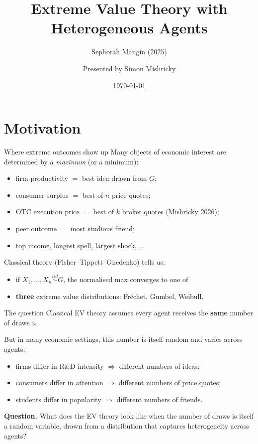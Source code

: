 \documentclass[aspectratio=169,xcolor=dvipsnames]{beamer}
\title{Extreme Value Theory with Heterogeneous Agents}
\subtitle{\normalsize Sephorah Mangin (2025)}
\author{Presented by Simon Mishricky}
\institute{TV$=$V Reading Group \\ Research School of Economics, Australian National University}
\date{\today}
\begin{document}
\section{Motivation}
\frame{\titlepage}

\begin{frame}{Where extreme outcomes show up}
    Many objects of economic interest are determined by a \emph{maximum} (or a minimum):
    \begin{itemize}
        \item firm productivity $=$ best idea drawn from $G$;
        \item consumer surplus $=$ best of $n$ price quotes;
        \item OTC execution price $=$ best of $k$ broker quotes \hfill {\small (Mishricky 2026)};
        \item peer outcome $=$ most studious friend;
        \item top income, longest spell, largest shock, $\ldots$
    \end{itemize}
    \vspace{3mm}
    Classical theory (Fisher--Tippett--Gnedenko) tells us:
    \begin{itemize}
        \item if $X_1,\dots,X_n \overset{iid}{\sim} G$, the normalised max converges to one of
        \item \textbf{three} extreme value distributions: Fr\'echet, Gumbel, Weibull.
    \end{itemize}
\end{frame}

\begin{frame}{The question}
    Classical EV theory assumes every agent receives the \textbf{same} number of draws $n$.
    \vspace{3mm}

    But in many economic settings, this number is itself random and varies across agents:
    \begin{itemize}
        \item firms differ in R\&D intensity $\Rightarrow$ different numbers of ideas;
        \item consumers differ in attention $\Rightarrow$ different numbers of price quotes;
        \item students differ in popularity $\Rightarrow$ different numbers of friends.
    \end{itemize}
    \vspace{3mm}
    \textbf{Question.} What does the EV theory look like when the number of draws is itself a random variable, drawn from a distribution that captures heterogeneity across agents?
\end{frame}
\end{document}
